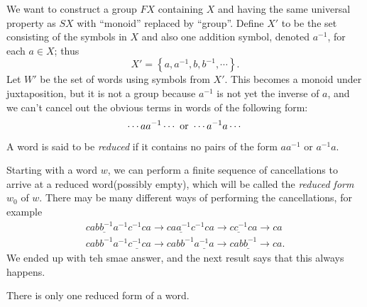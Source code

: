 We want to construct a group \( FX \) containing \( X \) and having the same
universal property as \( SX \) with ``monoid'' replaced by ``group''. Define \(
X' \) to be the set consisting of the symbols in \( X \) and also one addition
symbol, denoted \( a^{-1} \), for each \( a \in X \); thus
\[
  X' = \left\lbrace a, a^{-1}, b, b^{-1}, \cdots \right\rbrace.
\]
Let \( W' \) be the set of words using symbols from \( X' \). This becomes a
monoid under juxtaposition, but it is not a group because \( a^{-1} \) is not
yet the inverse of \( a \), and we can't cancel out the obvious terms in words
of the following form:
\[
  \cdots a a^{-1} \cdots \textmd{ or } \cdots a^{-1}a \cdots
\]
\begin{definition}
  A word is said to be \emph{reduced} if it contains no pairs of the form \( a a^{-1} \) or \( a^{-1} a \).
\end{definition}
Starting with a word \( w \), we can perform a finite sequence of cancellations to arrive at a reduced word(possibly empty), which will be called the \emph{reduced form} \( w_0 \) of \( w \).
There may be many different ways of performing the cancellations, for example
\begin{align*}
  ca\underline{bb^{-1}}a^{-1}c^{-1}ca \to c\underline{aa^{-1}}c^{-1}ca \to \underline{cc^{-1}}ca \to ca\\
  cabb^{-1}a^{-1}\underline{c^{-1}c} a\to ca bb^{-1} \underline{a^{-1}a} \to  ca \underline{bb^{-1}} \to ca.
\end{align*}
We ended up with teh smae answer, and the next result says that this always happens.
\begin{proposition}
  There is only one reduced form of a word.
\end{proposition}
